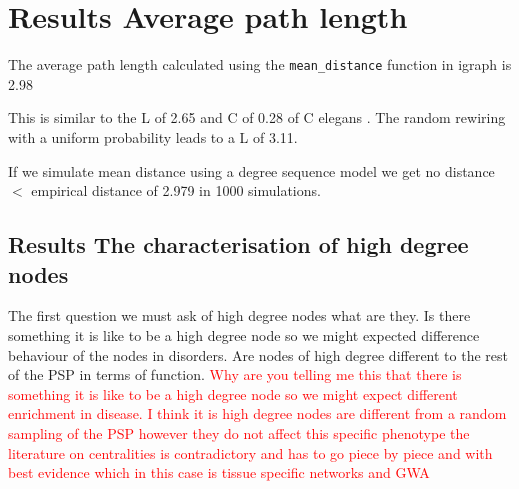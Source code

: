 \section{ Results Average path length}
\label{sec:Results average path length and transitivity}
The average path length calculated using the \texttt{mean\_distance} function in igraph is 2.98


This is similar to the L of 2.65 and C of 0.28 of C elegans . The random rewiring with a uniform probability leads to a L of 3.11. 

If we simulate mean distance using a degree sequence model we get no distance $<$ empirical distance of 2.979 in 1000 simulations.
\subsection{Results The characterisation of high degree nodes}
The first question we must ask of high degree nodes what are they. Is there something it is like to be a high degree node so we might expected difference behaviour of the nodes in disorders.
Are nodes of high degree different to the rest of the PSP in terms of function. 
\textcolor{red}{Why are you telling me this that there is something it is like to be a high degree node so we might expect different enrichment in disease. I think it is high degree nodes are different from a random sampling of the PSP however they do not affect this specific phenotype the literature on centralities is contradictory and has to go piece by piece and with best evidence which in this case is tissue specific networks and GWA}

